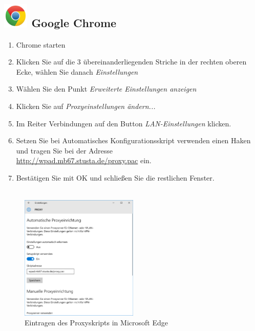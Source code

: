 \documentclass[a4paper,12pt]{scrartcl}
\begin{document}
\subsection*{\includegraphics[height=1.2cm,keepaspectratio]{Bilder/Chrome_2011_logo} Google Chrome}
\begin{enumerate}
	\item Chrome starten
    \item Klicken Sie auf die 3 übereinanderliegenden Striche in der rechten oberen Ecke, wählen Sie danach \emph{Einstellungen}
    \item Wählen Sie den Punkt \emph{Erweiterte Einstellungen anzeigen}
	\item Klicken Sie auf \emph{Proxyeinstellungen ändern...}
	\item Im Reiter Verbindungen auf den Button \emph{LAN-Ein\-stellungen} klicken.
    \item Setzen Sie bei Automatisches Konfigurationsskript verwenden einen Haken und tragen Sie bei der Adresse \\ \url{http://wpad.mb67.stusta.de/proxy.pac} ein.
    \item Bestätigen Sie mit OK und schließen Sie die restlichen Fenster.
    \\
    \\
\end{enumerate}


\begin{figure}
  \begin{center}
    \includegraphics[width=0.5\textwidth,keepaspectratio]{Bilder/Proxy_Edge}
  \end{center}
  \caption{Eintragen des Proxyskripts in Microsoft Edge}
\end{figure}
\end{document}
